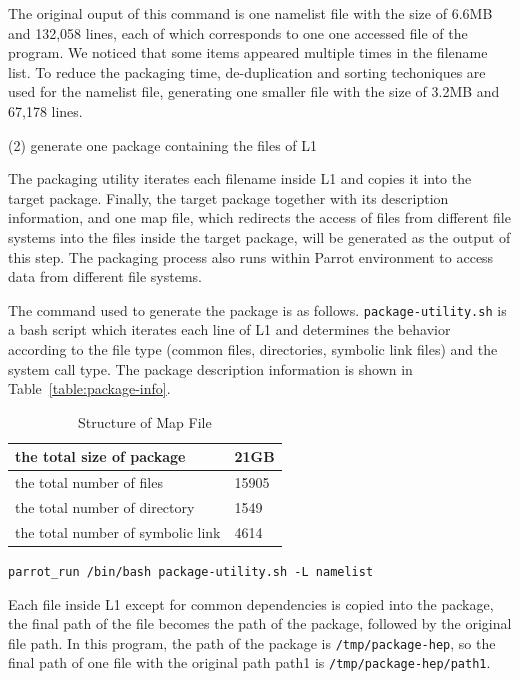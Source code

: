 \documentclass{acm_proc_article-sp}
\begin{document}
The original ouput of this command is one namelist file with the size of 6.6MB
and 132,058 lines, each of which corresponds to one one accessed file of the
program. We noticed that some items appeared multiple times in the filename list. To reduce the
packaging time, de-duplication and sorting techoniques are used for the
namelist file, generating one smaller file with the size of 3.2MB and 67,178 lines.

(2) generate one package containing the files of L1 

The packaging utility iterates each filename inside L1 and copies it into the
target package. Finally, the target package
together with its description information, and one map file, which redirects
the access of files from different file systems into the files inside the target package, will be
generated as the output of this step. The packaging process also runs within Parrot environment to
access data from different file systems.

The command used to generate the package is as follows. 
{\tt package-utility.sh} is a bash script which iterates each line of L1 and
determines the behavior according to the file type (common files, directories,
symbolic link files) and the system call type.
The package description information is shown in Table~\ref{table:package-info}.

\begin{table}
    \centering
    \begin{tabular}{|l|l|}
    \hline
     the total size of package&21GB \\ \hline
    the total number of files&15905\\ \hline
    the total number of directory&1549\\ \hline
    the total number of symbolic link&4614 \\ \hline
    \end{tabular}
    \caption{Structure of Map File}
    \label{table:map-file}
\end{table}

{\tt parrot\_run /bin/bash package-utility.sh -L namelist}

Each file inside L1 except for common dependencies is copied into the package, the final path of the file
becomes the path of the package, followed by the original file path. In this
program, the path of the package is {\tt /tmp/package-hep}, so the final path of one
file with the original path path1 is {\tt /tmp/package-hep/path1}.
\end{document}
